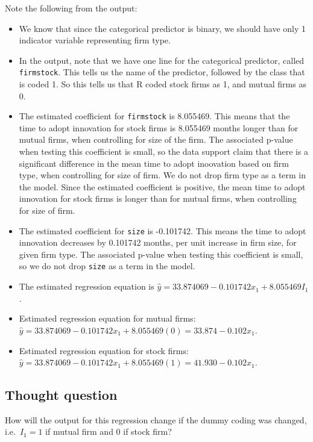 \documentclass[
]{book}
\begin{document}
Note the following from the output:

\begin{itemize}
\item
  We know that since the categorical predictor is binary, we should have only 1 indicator variable representing firm type.
\item
  In the output, note that we have one line for the categorical predictor, called \texttt{firmstock}. This tells us the name of the predictor, followed by the class that is coded 1. So this tells us that R coded stock firms as 1, and mutual firms as 0.
\item
  The estimated coefficient for \texttt{firmstock} is 8.055469. This means that the time to adopt innovation for stock firms is 8.055469 months longer than for mutual firms, when controlling for size of the firm. The associated p-value when testing this coefficient is small, so the data support claim that there is a significant difference in the mean time to adopt inoovation based on firm type, when controlling for size of firm. We do not drop firm type as a term in the model. Since the estimated coefficient is positive, the mean time to adopt innovation for stock firms is longer than for mutual firms, when controlling for size of firm.
\item
  The estimated coefficient for \texttt{size} is -0.101742. This means the time to adopt innovation decreases by 0.101742 months, per unit increase in firm size, for given firm type. The associated p-value when testing this coefficient is small, so we do not drop \texttt{size} as a term in the model.
\item
  The estimated regression equation is \(\hat{y} = 33.874069 - 0.101742 x_1 + 8.055469I_1\).
\item
  Estimated regression equation for mutual firms: \(\hat{y} = 33.874069 - 0.101742 x_1 + 8.055469(0) = 33.874 - 0.102 x_1\).
\item
  Estimated regression equation for stock firms: \(\hat{y} = 33.874069 - 0.101742 x_1 + 8.055469(1) = 41.930 - 0.102 x_1\).
\end{itemize}

\hypertarget{thought-question}{%
\subsection{Thought question}\label{thought-question}}

How will the output for this regression change if the dummy coding was changed, i.e.~\(I_1 = 1\) if mutual firm and 0 if stock firm?
\end{document}
